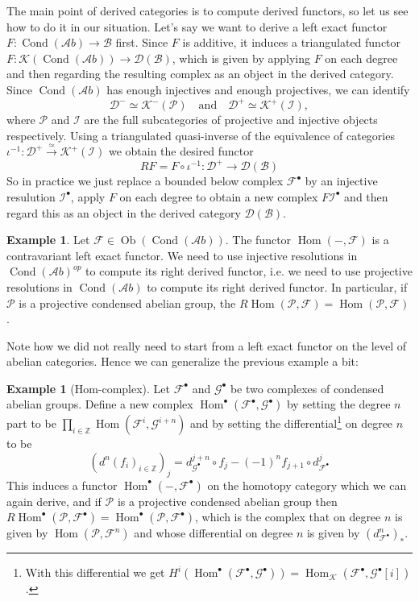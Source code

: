 \documentclass[11pt,A4]{article}
\theoremstyle{plain}
\theoremstyle{definition}
\newtheorem{exa}[thm]{Example}
\theoremstyle{remark}
\newcommand{\Z}{\mathbb{Z}}
\newcommand{\1}{\mathbbm{1}}
\newcommand{\F}{\mathcal{F}}
\newcommand{\G}{\mathcal{G}}
\newcommand{\calP}{\mathcal{P}}
\newcommand{\scrB}{\mathscr{B}}
\newcommand{\Ab}{\mathscr{A}b}
\newcommand{\D}{\mathscr{D}}
\newcommand{\K}{\mathscr{K}}
\DeclareMathOperator{\Hom}{Hom}
\DeclareMathOperator{\Cond}{Cond}
\DeclareMathOperator{\Ob}{Ob}
\newcommand{\grd}{^{\bullet}}
\begin{document}
The main point of derived categories is to compute derived functors, so let us see how to do it in our situation.
Let's say we want to derive a left exact functor $F\colon \Cond(\Ab)\to \scrB$ first.
Since $F$ is additive, it induces a triangulated functor $F\colon \K(\Cond(\Ab))\to \D(\scrB)$, which is given by applying $F$ on each degree and then regarding the resulting complex as an object in the derived category.
Since $\Cond(\Ab)$ has enough injectives and enough projectives, we can identify
\[ \D^{-}\simeq\K^{-}(\mathscr{P}) \quad \text{and} \quad \D^{+}\simeq\K^{+}(\mathscr{I}),\]
where $\mathscr{P}$ and $\mathscr{I}$ are the full subcategories of projective and injective objects respectively.
Using a triangulated quasi-inverse of the equivalence of categories $\iota^{-1}\colon \D^{+}\xrightarrow{\simeq}\K^{+}(\mathscr{I})$ we obtain the desired functor
\[ RF=F\circ \iota^{-1}\colon \D^{+}\to \D(\scrB) \]
So in practice we just replace a bounded below complex $\F\grd$ by an injective resulution $\mathcal{I}\grd$, apply $F$ on each degree to obtain a new complex $F\mathcal{I}\grd$ and then regard this as an object in the derived category $\D(\scrB)$.

\begin{exa}
    Let $\F\in\Ob(\Cond(\Ab))$.
    The functor $\Hom(-,\F)$ is a contravariant left exact functor.
    We need to use injective resolutions in $\Cond(\Ab)^{op}$ to compute its right derived functor, i.e. we need to use projective resolutions in $\Cond(\Ab)$ to compute its right derived functor.
    In particular, if $\calP$ is a projective condensed abelian group, the $R\Hom(\calP,\F)=\Hom(\calP,\F)$.
\end{exa}

Note how we did not really need to start from a left exact functor on the level of abelian categories.
Hence we can generalize the previous example a bit:

\begin{exa}[Hom-complex]
    Let $\F\grd$ and $\G\grd$ be two complexes of condensed abelian groups.
    Define a new complex $\Hom\grd(\F\grd,\G\grd)$ by setting the degree $n$ part to be $\prod_{i\in \Z}\Hom(\F^{i},\G^{i+n})$ and by setting the differential\footnote{With this differential we get $H^{i}(\Hom\grd(\F\grd,\G\grd))=\Hom_{\K}(\F\grd,\G\grd[i])$.} on degree $n$ to be
    \[ (d^{n}(f_{i})_{i\in \Z})_{j}=d^{j+n}_{\G\grd}\circ f_{j}-(-1)^{n}f_{j+1}\circ d_{\F\grd}^{j} \]
    This induces a functor $\Hom\grd(-,\F\grd)$ on the homotopy category which we can again derive, and if $\calP$ is a projective condensed abelian group then $R\Hom\grd(\calP,\F\grd)=\Hom\grd(\calP,\F\grd)$, which is the complex that on degree $n$ is given by $\Hom(\calP,\F^{n})$ and whose differential on degree $n$ is given by $(d_{\F\grd}^{n})_{*}$.
\end{exa}
\end{document}
